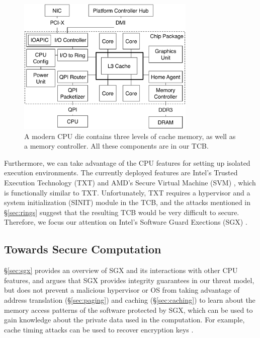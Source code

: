 \begin{figure}[hbtp]
  \centering
  \includegraphics[width=85mm]{figures/cpu_die.pdf}
  \caption{
    A modern CPU die contains three levels of cache memory, as well as a
    memory controller. All these components are in our TCB.
  }
  \label{fig:cpu_die}
\end{figure}

Furthermore, we can take advantage of the CPU features for setting up isolated
execution environments. The currently deployed features are Intel's Trusted
Execution Technology (TXT) \cite{grawrock2009txt} and AMD's Secure Virtual
Machine (SVM) \cite{strongin2005trusted}, which is functionally similar to TXT.
Unfortunately, TXT requires a hypervisor and a system initialization (SINIT)
module in the TCB, and the attacks mentioned in \S \ref{sec:rings} suggest that
the resulting TCB would be very difficult to secure. Therefore, we focus our
attention on Intel's Software Guard Exections (SGX) \cite{mckeen2013innovative}
\cite{anati2013sgx}.


\subsection{Towards Secure Computation}
\label{sec:approach}

\S \ref{sec:sgx} provides an overview of SGX and its interactions with other
CPU features, and argues that SGX provides integrity guarantees in our threat
model, but does not prevent a malicious hypervisor or OS from taking advantage
of address translation (\S \ref{sec:paging}) and caching (\S \ref{sec:caching})
to learn about the memory access patterns of the software protected by SGX,
which can be used to gain knowledge about the private data used in the
computation. For example, cache timing attacks can be used to recover
encryption keys \cite{bonneau2006cache} \cite{brumley2005remote}
\cite{kocher1996timing}.

